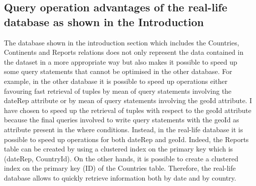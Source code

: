 \documentclass{article}
\begin{document}
\subsection{Query operation advantages of the real-life database as shown in the Introduction} \label{EX11Advantages}
The database shown in the introduction section which includes the Countries, Continents and Reports relations does not only represent the data contained in the dataset in a more appropriate way but also makes it possible to speed up some query statements that cannot be optimised in the other database. For example, in the other database it is possible to speed up operations either favouring fast retrieval of tuples by mean of query statements involving the dateRep attribute or by mean of query statements involving the geoId attribute. I have chosen to speed up the retrieval of tuples with respect to the geoId attribute because the final queries involved to write query statements with the geoId as attribute present in the where conditions.
Instead, in the real-life database it is possible to speed up operations for both dateRep and geoId. Indeed, the Reports table can be created by using a clustered index on the primary key which is (dateRep, CountryId). On the other hands, it is possible to create a clustered index on the primary key (ID) of the Countries table. Therefore, the real-life database allows to quickly retrieve information both by date and by country.
\end{document}
